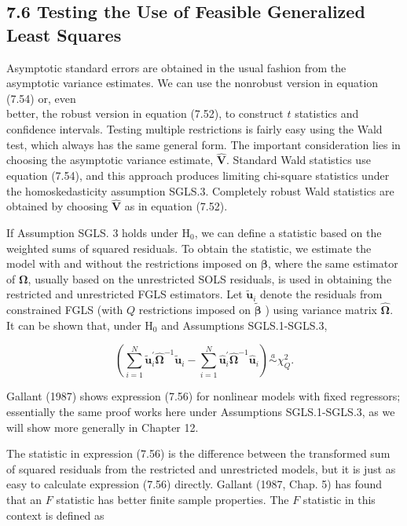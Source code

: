\documentclass[10pt]{article}
\begin{document}
\subsection*{7.6 Testing the Use of Feasible Generalized Least Squares}
Asymptotic standard errors are obtained in the usual fashion from the asymptotic variance estimates. We can use the nonrobust version in equation (7.54) or, even\\
better, the robust version in equation (7.52), to construct $t$ statistics and confidence intervals. Testing multiple restrictions is fairly easy using the Wald test, which always has the same general form. The important consideration lies in choosing the asymptotic variance estimate, $\hat{\mathbf{V}}$. Standard Wald statistics use equation (7.54), and this approach produces limiting chi-square statistics under the homoskedasticity assumption SGLS.3. Completely robust Wald statistics are obtained by choosing $\hat{\mathbf{V}}$ as in equation (7.52).

If Assumption SGLS. 3 holds under $\mathrm{H}_{0}$, we can define a statistic based on the weighted sums of squared residuals. To obtain the statistic, we estimate the model with and without the restrictions imposed on $\boldsymbol{\beta}$, where the same estimator of $\boldsymbol{\Omega}$, usually based on the unrestricted SOLS residuals, is used in obtaining the restricted and unrestricted FGLS estimators. Let $\tilde{\mathbf{u}}_{i}$ denote the residuals from constrained FGLS (with $Q$ restrictions imposed on $\tilde{\boldsymbol{\beta}}$ ) using variance matrix $\hat{\boldsymbol{\Omega}}$. It can be shown that, under $\mathrm{H}_{0}$ and Assumptions SGLS.1-SGLS.3,


\begin{equation*}
\left(\sum_{i=1}^{N} \tilde{\mathbf{u}}_{i}^{\prime} \hat{\boldsymbol{\Omega}}^{-1} \tilde{\mathbf{u}}_{i}-\sum_{i=1}^{N} \hat{\mathbf{u}}_{i}^{\prime} \hat{\boldsymbol{\Omega}}^{-1} \hat{\mathbf{u}}_{i}\right) \stackrel{a}{\sim} \chi_{Q}^{2} . \tag{7.56}
\end{equation*}


Gallant (1987) shows expression (7.56) for nonlinear models with fixed regressors; essentially the same proof works here under Assumptions SGLS.1-SGLS.3, as we will show more generally in Chapter 12.

The statistic in expression (7.56) is the difference between the transformed sum of squared residuals from the restricted and unrestricted models, but it is just as easy to calculate expression (7.56) directly. Gallant (1987, Chap. 5) has found that an $F$ statistic has better finite sample properties. The $F$ statistic in this context is defined as
\end{document}
